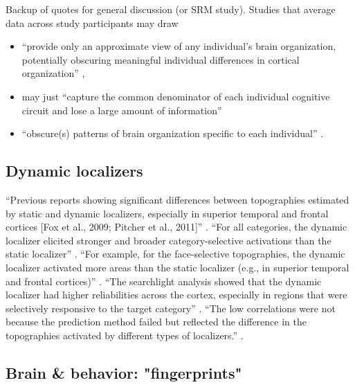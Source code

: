 Backup of quotes for general discussion (or SRM study).  Studies that average
data across study participants may draw

\begin{itemize}

\item ``provide only an approximate view of any individual's brain organization,
    potentially obscuring meaningful individual differences in cortical
        organization'' \citep{laumann2015functional},

\item may just ``capture the common denominator of each individual cognitive
    circuit and lose a large amount of information''

\item ``obscure(s) patterns of brain organization specific to each individual''
    \citep{laumann2015functional}.

\end{itemize}


\subsection{Dynamic localizers}
%
``Previous reports showing significant differences between topographies
estimated by static and dynamic localizers, especially in superior temporal and
frontal cortices [Fox et al., 2009; Pitcher et al., 2011]''
\citep{jiahui2022cross}.
%
``For all categories, the dynamic localizer elicited stronger and broader
category-selective activations than the static localizer''
\citep{jiahui2022cross}.
%
``For example, for the face-selective topographies, the dynamic localizer
activated more areas than the static localizer (e.g., in superior temporal and
frontal cortices)'' \citep{jiahui2022cross}.
%
``The searchlight analysis showed that the dynamic localizer had higher
reliabilities across the cortex, especially in regions that were selectively
responsive to the target category'' \citep{jiahui2022cross}.
%
``The low correlations were not because the prediction method failed but
reflected the difference in the topographies activated by different types of
localizers.'' \citep{jiahui2022cross}.


\subsection{Brain \& behavior: "fingerprints"}

